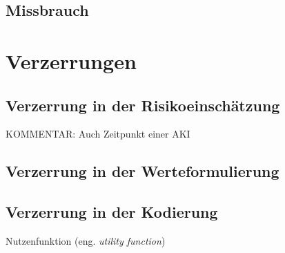 \subsection{Missbrauch}
%
%
%
\section{Verzerrungen}
\subsection{Verzerrung in der Risikoeinschätzung}
KOMMENTAR: Auch Zeitpunkt einer AKI
\subsection{Verzerrung in der Werteformulierung}
\subsection{Verzerrung in der Kodierung}
Nutzenfunktion (eng. \emph{utility function})

